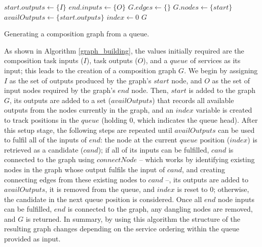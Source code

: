\documentclass{llncs}
\begin{document}
\begin{algorithm}[h]
 \setlength{}
 \LinesNumbered
 \SetNlSty{}{}{:}
 $start.outputs \leftarrow \{I\}$\;
 $end.inputs \leftarrow \{O\}$\;
 $G.edges \leftarrow \{\}$\;
 $G.nodes \leftarrow \{start\}$\;
 $availOutputs \leftarrow \{start.outputs\}$\;
 $index \leftarrow 0$\;
 \;
 \;
 \KwRet $G$\;
 \vspace{2mm}
 \caption{Generating a composition graph from a queue.}
\label{graph_building}
\end{algorithm}

 As shown in Algorithm \ref{graph_building}, the values initially required are the composition task inputs ($I$), task outputs ($O$), and a $queue$ of services as its input; this leads to the creation of a composition graph $G$. We begin by assigning $I$ as the set of outputs produced by the graph's $start$ node, and $O$ as the set of input nodes required by the graph's $end$ node. Then, $start$ is added to the graph $G$, its outputs are added to a set ($availOutputs$) that records all available outputs from the nodes currently in the graph, and an $index$ variable is created to track positions in the $queue$ (holding 0, which indicates the queue head). After this setup stage, the following steps are repeated until $availOutputs$ can be used to fulfil all of the inputs of $end$: the node at the current $queue$ position ($index$) is retrieved as a candidate ($cand$); if all of its inputs can be fulfilled, $cand$ is connected to the graph using $connectNode$ -- which works by identifying existing nodes in the graph whose output fulfils the input of $cand$, and creating connecting edges from these existing nodes to $cand$ --, its outputs are added to $availOutputs$, it is removed from the queue, and $index$ is reset to 0; otherwise, the candidate in the next queue position is considered. Once all $end$ node inputs can be fulfilled, $end$ is connected to the graph, any dangling nodes are removed, and $G$ is returned. In summary, by using this algorithm the structure of the resulting graph changes depending on the service ordering within the queue provided as input.
\end{document}
